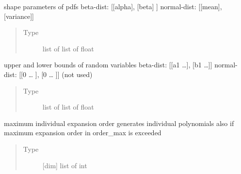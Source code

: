 \documentclass[letterpaper,10pt,english,openany,oneside]{sphinxmanual}
\begin{document}
\begin{fulllineitems}
\begin{fulllineitems}
\begin{quote}
\begin{description}
\end{description}\end{quote}

\end{fulllineitems}


\begin{fulllineitems}
\label{\detokenize{pygpc:pygpc.reg.Reg.pdf_shape}}
shape parameters of pdfs
beta-dist:   {[}{[}alpha{]}, {[}beta{]}    {]}
normal-dist: {[}{[}mean{]},  {[}variance{]}{]}
\begin{quote}\begin{description}
\item[{Type}] \leavevmode
list of list of float

\end{description}\end{quote}

\end{fulllineitems}


\begin{fulllineitems}
\label{\detokenize{pygpc:pygpc.reg.Reg.limits}}
upper and lower bounds of random variables
beta-dist:   {[}{[}a1 …{]}, {[}b1 …{]}{]}
normal-dist: {[}{[}0 … {]}, {[}0 … {]}{]} (not used)
\begin{quote}\begin{description}
\item[{Type}] \leavevmode
list of list of float

\end{description}\end{quote}

\end{fulllineitems}


\begin{fulllineitems}
\label{\detokenize{pygpc:pygpc.reg.Reg.order}}
maximum individual expansion order
generates individual polynomials also if maximum expansion order in order\_max is exceeded
\begin{quote}\begin{description}
\item[{Type}] \leavevmode
{[}dim{]} list of int


\end{description}
\end{quote}
\end{fulllineitems}
\end{fulllineitems}
\end{document}
